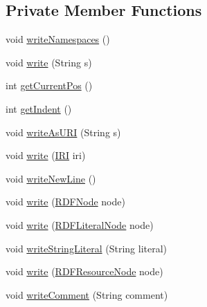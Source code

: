 \subsection*{Private Member Functions}
\begin{DoxyCompactItemize}
\item 
void \hyperlink{classorg_1_1coode_1_1owlapi_1_1turtle_1_1_turtle_renderer_abf2a0a1423c5f2bf1575dc7d4e502d94}{write\-Namespaces} ()
\item 
void \hyperlink{classorg_1_1coode_1_1owlapi_1_1turtle_1_1_turtle_renderer_a0a8be9b7adcd5957d862335e7c9b24c4}{write} (String s)
\item 
int \hyperlink{classorg_1_1coode_1_1owlapi_1_1turtle_1_1_turtle_renderer_a405a0fe2ba929ac8ab64bc54e86d83c4}{get\-Current\-Pos} ()
\item 
int \hyperlink{classorg_1_1coode_1_1owlapi_1_1turtle_1_1_turtle_renderer_aff60852bc4a44e058e608090d9657375}{get\-Indent} ()
\item 
void \hyperlink{classorg_1_1coode_1_1owlapi_1_1turtle_1_1_turtle_renderer_a86904d3bb8da4f11dda14c851b00f455}{write\-As\-U\-R\-I} (String s)
\item 
void \hyperlink{classorg_1_1coode_1_1owlapi_1_1turtle_1_1_turtle_renderer_a85e639d22ec0b30b969a2b4c16dd1e04}{write} (\hyperlink{classorg_1_1semanticweb_1_1owlapi_1_1model_1_1_i_r_i}{I\-R\-I} iri)
\item 
void \hyperlink{classorg_1_1coode_1_1owlapi_1_1turtle_1_1_turtle_renderer_a04eca3253eb97d40b2603dd885527e7d}{write\-New\-Line} ()
\item 
void \hyperlink{classorg_1_1coode_1_1owlapi_1_1turtle_1_1_turtle_renderer_a7d75f65473292c753d10a81a540cff77}{write} (\hyperlink{classorg_1_1coode_1_1owlapi_1_1rdf_1_1model_1_1_r_d_f_node}{R\-D\-F\-Node} node)
\item 
void \hyperlink{classorg_1_1coode_1_1owlapi_1_1turtle_1_1_turtle_renderer_a58292361f0f6f31ffaa124867ccfab6f}{write} (\hyperlink{classorg_1_1coode_1_1owlapi_1_1rdf_1_1model_1_1_r_d_f_literal_node}{R\-D\-F\-Literal\-Node} node)
\item 
void \hyperlink{classorg_1_1coode_1_1owlapi_1_1turtle_1_1_turtle_renderer_a8081ffa4802e817d5ac41b866ccf81f0}{write\-String\-Literal} (String literal)
\item 
void \hyperlink{classorg_1_1coode_1_1owlapi_1_1turtle_1_1_turtle_renderer_a89c9469685fc7c139d007ee83e80272d}{write} (\hyperlink{classorg_1_1coode_1_1owlapi_1_1rdf_1_1model_1_1_r_d_f_resource_node}{R\-D\-F\-Resource\-Node} node)
\item 
void \hyperlink{classorg_1_1coode_1_1owlapi_1_1turtle_1_1_turtle_renderer_a7c2b59c662ab3d206150fb97e086b613}{write\-Comment} (String comment)
\end{DoxyCompactItemize}
